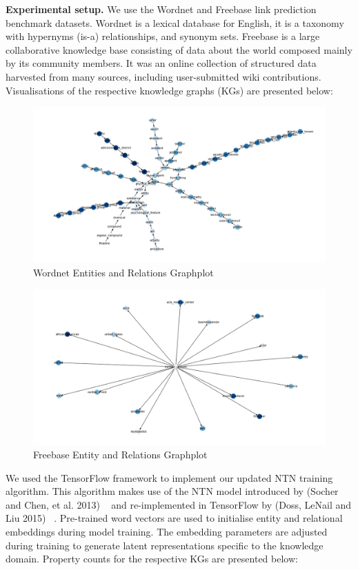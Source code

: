 \noindent \textbf{Experimental setup.} We use the Wordnet and Freebase link prediction benchmark datasets. Wordnet is a lexical database for English, it is a taxonomy with hypernyms (is-a) relationships, and synonym sets. Freebase is a large collaborative knowledge base consisting of data about the world composed mainly by its community members. It was an online collection of structured data harvested from many sources, including user-submitted wiki contributions. Visualisations of the respective knowledge graphs (KGs) are presented below:

\begin{figure}[H]
   	\centering
    	\includegraphics[width=\textwidth]{Wordnet}
	\caption{Wordnet Entities and Relations Graphplot}
\end{figure}

\begin{figure}[H]
   	\centering
    	\includegraphics[width=\textwidth]{Freebase}
	\caption{Freebase Entity and Relations Graphplot}
\end{figure}

\noindent We used the TensorFlow framework to implement our updated NTN training algorithm.  This algorithm makes use of the NTN model introduced by (Socher and Chen, et al. 2013) \unskip ~\citep{socher2013reasoning} and re-implemented in TensorFlow by (Doss, LeNail and Liu 2015) \unskip ~\citep{Doss2015}. Pre-trained word vectors are used to initialise entity and relational embeddings during model training. The embedding parameters are adjusted during training to generate latent representations specific to the knowledge domain. Property counts for the respective KGs are presented below:

